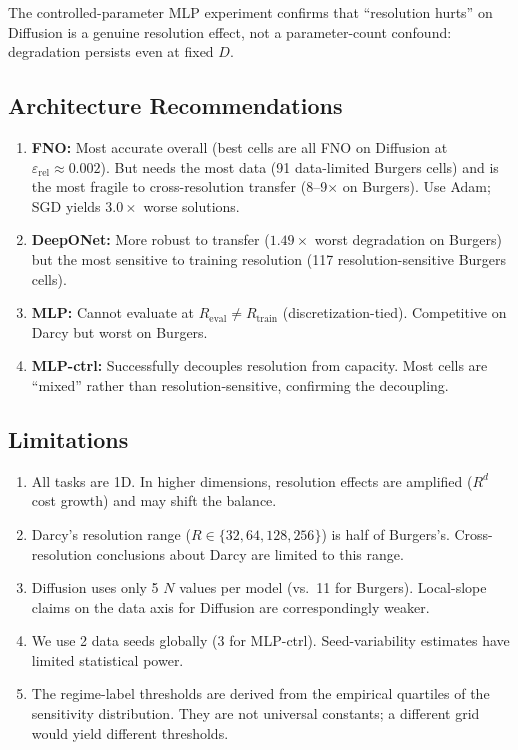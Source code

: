 \documentclass[11pt]{article}
\newcommand{\Reval}{R_{\mathrm{eval}}}
\newcommand{\Rtrain}{R_{\mathrm{train}}}
\newcommand{\relLtwo}{\varepsilon_{\mathrm{rel}}}
\newcommand{\deeponetWorstDeg}{1.49}
\newcommand{\sgdFnoRatio}{3.0}
\begin{document}
The controlled-parameter MLP experiment confirms that ``resolution
hurts'' on Diffusion is a genuine resolution effect, not a
parameter-count confound: degradation persists even at fixed $D$.

\subsection{Architecture Recommendations}

\begin{enumerate}
  \item \textbf{FNO:} Most accurate overall (best cells are all
    FNO on Diffusion at $\relLtwo \approx 0.002$). But needs the most
    data (91 data-limited Burgers cells) and is the most fragile to
    cross-resolution transfer (8--9$\times$ on Burgers). Use Adam;
    SGD yields $\sgdFnoRatio{\times}$ worse solutions.
  \item \textbf{DeepONet:} More robust to transfer ($\deeponetWorstDeg{\times}$
    worst degradation on Burgers) but the most sensitive to training
    resolution (117 resolution-sensitive Burgers cells).
  \item \textbf{MLP:} Cannot evaluate at $\Reval \neq \Rtrain$
    (discretization-tied). Competitive on Darcy but worst on Burgers.
  \item \textbf{MLP-ctrl:} Successfully decouples resolution from
    capacity. Most cells are ``mixed'' rather than
    resolution-sensitive, confirming the decoupling.
\end{enumerate}

\subsection{Limitations}

\begin{enumerate}
  \item All tasks are 1D. In higher dimensions, resolution effects are
    amplified ($R^d$ cost growth) and may shift the balance.
  \item Darcy's resolution range ($R \in \{32, 64, 128, 256\}$) is
    half of Burgers's. Cross-resolution conclusions about Darcy are
    limited to this range.
  \item Diffusion uses only 5 $N$ values per model (vs.\ 11 for
    Burgers). Local-slope claims on the data axis for Diffusion are
    correspondingly weaker.
  \item We use 2 data seeds globally (3 for MLP-ctrl). Seed-variability
    estimates have limited statistical power.
  \item The regime-label thresholds are derived from the empirical
    quartiles of the sensitivity distribution. They are not universal
    constants; a different grid would yield different thresholds.
\end{enumerate}
\end{document}
